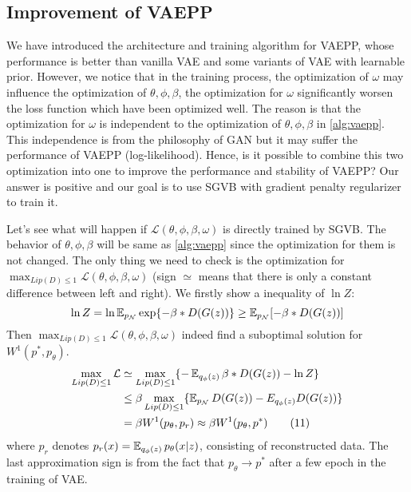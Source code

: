 \subsection{Improvement of VAEPP}
We have introduced the architecture and training algorithm for VAEPP, whose performance is better than vanilla VAE and some variants of VAE with learnable prior. However, we notice that in the training process, the optimization of $\omega$ may influence the optimization of $\theta, \phi, \beta$, \EG the optimization for $\omega$ significantly worsen the loss function which have been optimized well. The reason is that the optimization for $\omega$ is independent to the optimization of $\theta, \phi, \beta$ in \cref{alg:vaepp}. This independence is from the philosophy of GAN but it may suffer the performance of VAEPP (log-likelihood). Hence, is it possible to combine this two optimization into one to improve the performance and stability of VAEPP? Our answer is positive and our goal is to use SGVB with gradient penalty regularizer to train it. 

Let's see what will happen if $\mathcal{L}(\theta, \phi, \beta, \omega)$ is directly trained by SGVB. The behavior of $\theta, \phi, \beta$ will be same as \cref{alg:vaepp} since the optimization for them is not changed. The only thing we need to check is the optimization for $\max_{Lip(D) \leq 1} \mathcal{L}(\theta, \phi, \beta, \omega)$ (sign $\simeq$ means that there is only a constant difference between left and right). We firstly show a inequality of $\ln Z$:
\begin{equation*}
	\ln Z = \ln \operatorname{\mathbb{E}}_{p_\mathcal{N}} \exp \{- \beta * D(G(z))\} \geq \operatorname{\mathbb{E}}_{p_\mathcal{N}} [- \beta * D(G(z))]
\end{equation*}
Then $\max_{Lip(D) \leq 1} \mathcal{L}(\theta, \phi, \beta, \omega)$ indeed find a suboptimal solution for $W^1(p^*, p_\theta)$. 
\begin{align*}\label{eq:improve_vaepp}
	\max_{Lip(D) \leq 1} \mathcal{L} &\simeq \max_{Lip(D) \leq 1} \{ -\operatorname{\mathbb{E}}_{q_\phi(z)} \beta*D(G(z)) - \ln Z \}\\ 
	&\leq \beta \max_{Lip(D) \leq 1} \{ \operatorname{\mathbb{E}}_{p_\mathcal{N}} D(G(z)) - E_{q_\phi(z)} D(G(z)) \} \\
	&= \beta W^1(p_\theta, p_r) \approx \beta W^1(p_\theta, p^*) \tag{11}
\end{align*}
where $p_r$ denotes $p_r(x) = \operatorname{\mathbb{E}}_{q_\phi(z)} p_\theta(x|z)$, consisting of reconstructed data. The last approximation sign is from the fact that $p_\theta \rightarrow p^*$ after a few epoch in the training of VAE. 

